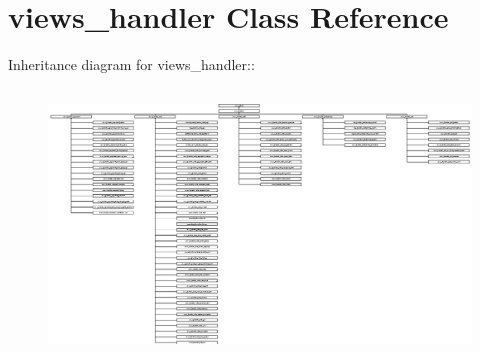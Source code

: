 \hypertarget{classviews__handler}{
\section{views\_\-handler Class Reference}
\label{classviews__handler}
}
Inheritance diagram for views\_\-handler::\begin{figure}[H]
\begin{center}
\leavevmode
\includegraphics[height=7.1454cm]{classviews__handler}
\end{center}
\end{figure}
